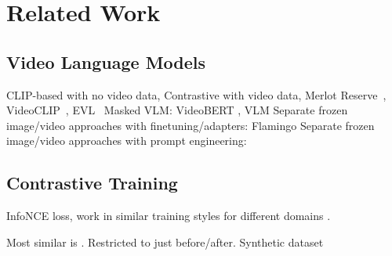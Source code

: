 \chapter{Related Work}
\label{chap:rel}

\section{Video Language Models}
\label{sec:vidlmb}

CLIP-based \citep{radford2021clip} with no video data, 
Contrastive with video data, Merlot Reserve~\cite{zellers2022mreserve}, VideoCLIP~\cite{xu2021videoclip}, EVL~\cite{lin2022evl}
Masked VLM: VideoBERT \citep{sun2019videobert}, VLM \citep{xu2021vlm}
Separate frozen image/video approaches with finetuning/adapters: Flamingo \citep{alayrac2022flamingo}
Separate frozen image/video approaches with prompt engineering: \citep{wang2022vidil, zeng2023socratic}


\section{Contrastive Training}
\label{sec:contrastive}

InfoNCE loss, work in similar training styles for different domains
\citep{momeni2023verbs, yuksekgonul2023when}.

Most similar is \cite{bagad2023testoftime}. Restricted to just before/after.
Synthetic dataset


